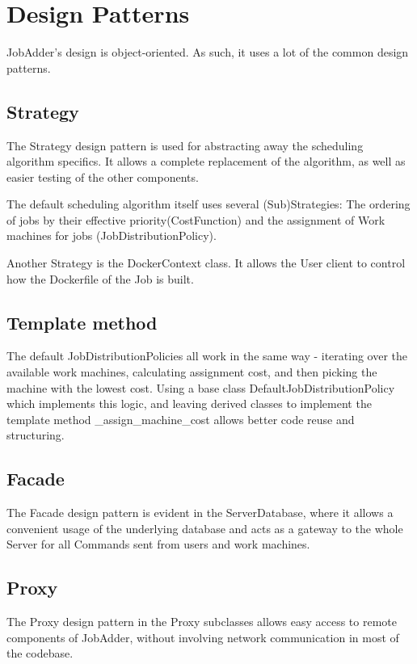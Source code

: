 \chapter{Design Patterns}
    JobAdder's design is object-oriented. As such, it uses a lot of the common design patterns.
    \section{Strategy}
        The Strategy design pattern is used for abstracting away the scheduling algorithm specifics.
        It allows a complete replacement of the algorithm, as well as easier testing of the other components.

        The default scheduling algorithm itself uses several (Sub)Strategies: The ordering of jobs by their effective
        priority(CostFunction) and the assignment of Work machines for jobs (JobDistributionPolicy).

        Another Strategy is the DockerContext class. It allows the User client to control how the Dockerfile of the Job
        is built.
    \section{Template method}
        The default JobDistributionPolicies all work in the same way - iterating over the available work machines,
        calculating assignment cost, and then picking the machine with the lowest cost. Using a
        base class DefaultJobDistributionPolicy which implements this logic, and leaving derived classes to implement
        the template method \_assign\_machine\_cost allows better code reuse and structuring.

    \section{Facade}
        The Facade design pattern is evident in the ServerDatabase, where it allows a convenient usage of the underlying
        database and acts as a gateway to the whole Server for all Commands sent from users and work machines.

    \section{Proxy}
        The Proxy design pattern in the Proxy subclasses allows easy access to remote components of JobAdder, without involving
        network communication in most of the codebase.

